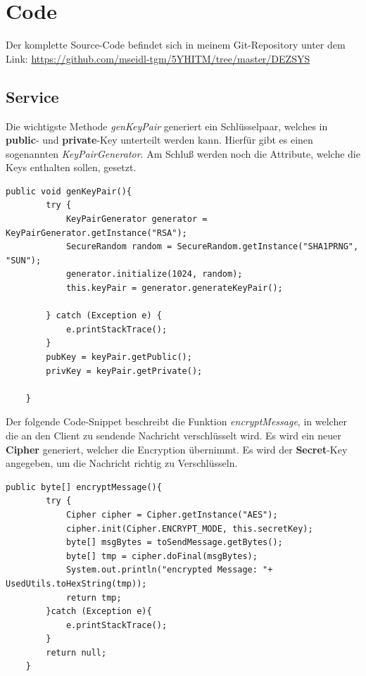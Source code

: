 \section{Code}

Der komplette Source-Code befindet sich in meinem Git-Repository unter dem Link:
\url{https://github.com/mseidl-tgm/5YHITM/tree/master/DEZSYS}

\newpage
\subsection{Service}

Die wichtigste Methode \textit{genKeyPair} generiert ein Schlüsselpaar, welches in \textbf{public}- und \textbf{private}-Key unterteilt werden kann.
Hierfür gibt es einen sogenannten \textit{KeyPairGenerator}. Am Schluß werden noch die Attribute, welche die Keys enthalten sollen, gesetzt.


\begin{lstlisting}[style=Java, caption= RSA KeyPair generation]
    public void genKeyPair(){
	    try {
		    KeyPairGenerator generator = KeyPairGenerator.getInstance("RSA");
		    SecureRandom random = SecureRandom.getInstance("SHA1PRNG", "SUN");
		    generator.initialize(1024, random);
			this.keyPair = generator.generateKeyPair();
    
	    } catch (Exception e) {
		    e.printStackTrace();
	    }
	    pubKey = keyPair.getPublic();
	    privKey = keyPair.getPrivate();
    
    }

\end{lstlisting}

Der folgende Code-Snippet beschreibt die Funktion \textit{encryptMessage}, in welcher die an den Client zu sendende Nachricht verschlüsselt wird.
Es wird ein neuer \textbf{Cipher} generiert, welcher die Encryption übernimmt. Es wird der \textbf{Secret}-Key angegeben, um die Nachricht richtig zu
Verschlüsseln.
\newline

\begin{lstlisting}[style=Java, caption= Message encrypting]
	public byte[] encryptMessage(){
		try {
			Cipher cipher = Cipher.getInstance("AES");
			cipher.init(Cipher.ENCRYPT_MODE, this.secretKey);
			byte[] msgBytes = toSendMessage.getBytes();
			byte[] tmp = cipher.doFinal(msgBytes);
			System.out.println("encrypted Message: "+ UsedUtils.toHexString(tmp));
			return tmp;
		}catch (Exception e){
			e.printStackTrace();
		}
		return null;
	}
\end{lstlisting}

